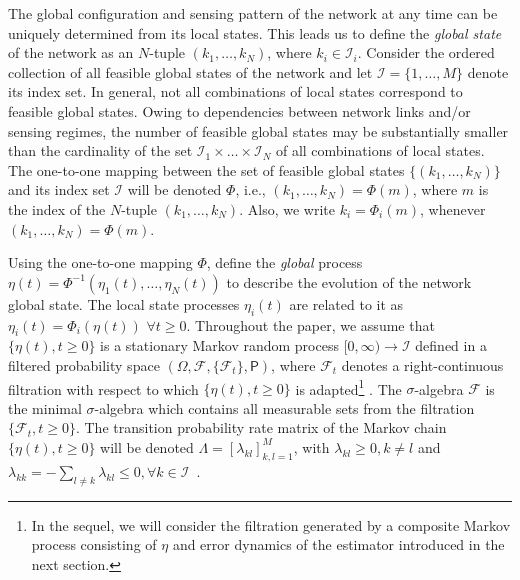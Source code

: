 \documentclass[a4paper,twocolumn]{autart}
\begin{document}
The global configuration and sensing pattern of the network at
any time can be uniquely determined from its local states. This leads us to
define the \emph{global state} of the network as an $N$-tuple
$(k_1,\ldots,k_N)$, where $k_i\in \mathcal{I}_i$. 
Consider the ordered collection of all feasible global states of the
network and let $\mathcal{I}=\{1,\ldots,M\}$ denote its 
index set.  In general, not all
combinations of local states correspond to feasible global states. Owing to
dependencies between network links and/or sensing regimes, the number of
feasible global states may be substantially smaller than the cardinality of
the set $\mathcal{I}_1\times\ldots\times \mathcal{I}_N$ of all
combinations of local states. The one-to-one mapping between
the set of feasible global states  
$\{(k_1,\ldots,k_N)\}$ and its index set $\mathcal{I}$ will be denoted
$\Phi$, i.e., $(k_1,\ldots,k_N)=\Phi(m)$, where $m$ is the index of the
$N$-tuple  $(k_1,\ldots,k_N)$.  Also, we write
$k_i=\Phi_i(m)$, whenever $(k_1, \ldots, k_N)=\Phi(m)$. 

Using the one-to-one mapping $\Phi$, define the \emph{global} process 
$\eta(t)=\Phi^{-1}(\eta_1(t),\ldots,  \eta_N(t))$ to describe the evolution
of the network global state. 
The local state processes $\eta_i(t)$ are related to it as
$\eta_i(t)=\Phi_i(\eta(t))$ $\forall t\ge 0$.  Throughout the paper, we
assume that
$\{\eta (t),t\geq 0\}$ is a stationary Markov random process $[0,\infty)\to
\mathcal{I}$ defined in a
filtered probability space $(\Omega, \mathcal{F}, 
\{\mathcal{F}_t\},\mathsf{P})$, where $\mathcal{F}_t$ denotes a 
right-continuous filtration with 
respect to which $\{\eta(t),t\geq 0\}$ is adapted\footnote{In the sequel,
  we will consider the
  filtration generated by a composite Markov process consisting of
  $\eta$ and error dynamics of the estimator introduced in the next section.}   
  \cite{BC-2009}. 
The $\sigma$-algebra $\mathcal{F}$ is the minimal
$\sigma$-algebra which contains all measurable sets from the filtration
$\{\mathcal{F}_t,t\ge 0\}$. 
The transition probability rate matrix of the Markov chain $\{\eta (t),t\geq 
0\}$ will be denoted $\Lambda=[\lambda_{kl}]_{k,l=1}^M$, with
$\lambda_{kl}\geq 0,k\neq l$ and $\lambda_{kk}=-\sum\limits_{l\neq
  k}{\lambda_{kl}\leq 0,\forall k \in \mathcal{I}}$~\cite{BC-2009}.  
\end{document}
